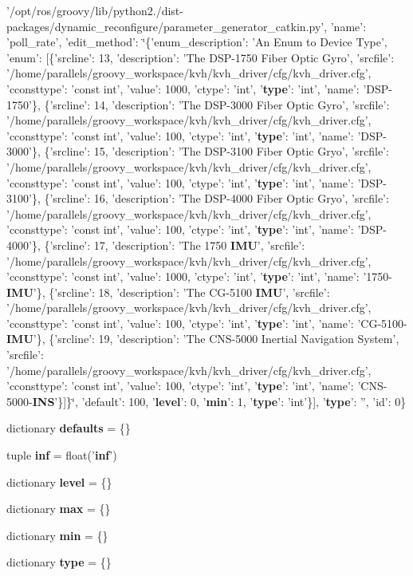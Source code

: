 \begin{DoxyCompactItemize}
'/opt/ros/groovy/lib/python2./dist-\/packages/dynamic\-\_\-reconfigure/parameter\-\_\-generator\-\_\-catkin.\-py', 'name'\-: 'poll\-\_\-rate', 'edit\-\_\-method'\-: \char`\"{}\{'enum\-\_\-description'\-: '\-An \-Enum to \-Device \-Type', 'enum'\-: [\{'srcline'\-: 13, 'description'\-: '\-The \-D\-S\-P-\/1750 \-Fiber \-Optic \-Gyro', 'srcfile'\-: '/home/parallels/groovy\-\_\-workspace/kvh/kvh\-\_\-driver/cfg/kvh\-\_\-driver.\-cfg', 'cconsttype'\-: 'const int', 'value'\-: 1000, 'ctype'\-: 'int', '{\bf type}'\-: 'int', 'name'\-: '\-D\-S\-P-\/1750'\}, \{'srcline'\-: 14, 'description'\-: '\-The \-D\-S\-P-\/3000 \-Fiber \-Optic \-Gyro', 'srcfile'\-: '/home/parallels/groovy\-\_\-workspace/kvh/kvh\-\_\-driver/cfg/kvh\-\_\-driver.\-cfg', 'cconsttype'\-: 'const int', 'value'\-: 100, 'ctype'\-: 'int', '{\bf type}'\-: 'int', 'name'\-: '\-D\-S\-P-\/3000'\}, \{'srcline'\-: 15, 'description'\-: '\-The \-D\-S\-P-\/3100 \-Fiber \-Optic \-Gryo', 'srcfile'\-: '/home/parallels/groovy\-\_\-workspace/kvh/kvh\-\_\-driver/cfg/kvh\-\_\-driver.\-cfg', 'cconsttype'\-: 'const int', 'value'\-: 100, 'ctype'\-: 'int', '{\bf type}'\-: 'int', 'name'\-: '\-D\-S\-P-\/3100'\}, \{'srcline'\-: 16, 'description'\-: '\-The \-D\-S\-P-\/4000 \-Fiber \-Optic \-Gryo', 'srcfile'\-: '/home/parallels/groovy\-\_\-workspace/kvh/kvh\-\_\-driver/cfg/kvh\-\_\-driver.\-cfg', 'cconsttype'\-: 'const int', 'value'\-: 100, 'ctype'\-: 'int', '{\bf type}'\-: 'int', 'name'\-: '\-D\-S\-P-\/4000'\}, \{'srcline'\-: 17, 'description'\-: '\-The 1750 {\bf \-I\-M\-U}', 'srcfile'\-: '/home/parallels/groovy\-\_\-workspace/kvh/kvh\-\_\-driver/cfg/kvh\-\_\-driver.\-cfg', 'cconsttype'\-: 'const int', 'value'\-: 1000, 'ctype'\-: 'int', '{\bf type}'\-: 'int', 'name'\-: '1750-\/{\bf \-I\-M\-U}'\}, \{'srcline'\-: 18, 'description'\-: '\-The \-C\-G-\/5100 {\bf \-I\-M\-U}', 'srcfile'\-: '/home/parallels/groovy\-\_\-workspace/kvh/kvh\-\_\-driver/cfg/kvh\-\_\-driver.\-cfg', 'cconsttype'\-: 'const int', 'value'\-: 100, 'ctype'\-: 'int', '{\bf type}'\-: 'int', 'name'\-: '\-C\-G-\/5100-\/{\bf \-I\-M\-U}'\}, \{'srcline'\-: 19, 'description'\-: '\-The \-C\-N\-S-\/5000 \-Inertial \-Navigation \-System', 'srcfile'\-: '/home/parallels/groovy\-\_\-workspace/kvh/kvh\-\_\-driver/cfg/kvh\-\_\-driver.\-cfg', 'cconsttype'\-: 'const int', 'value'\-: 100, 'ctype'\-: 'int', '{\bf type}'\-: 'int', 'name'\-: '\-C\-N\-S-\/5000-\/{\bf \-I\-N\-S}'\}]\}\char`\"{}, 'default'\-: 100, '{\bf level}'\-: 0, '{\bf min}'\-: 1, '{\bf type}'\-: 'int'\}], '{\bf type}'\-: '', 'id'\-: 0\}
\item 
dictionary {\bf defaults} = \{\}
\item 
tuple {\bf inf} = float('{\bf inf}')
\item 
dictionary {\bf level} = \{\}
\item 
dictionary {\bf max} = \{\}
\item 
dictionary {\bf min} = \{\}
\item 
dictionary {\bf type} = \{\}
\end{DoxyCompactItemize}


